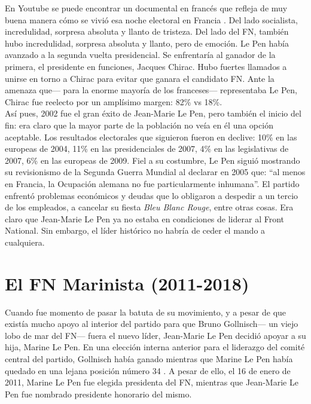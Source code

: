 En Youtube se puede encontrar un documental en francés que refleja de muy buena manera cómo se vivió esa noche electoral en Francia \parencite{Capo17}. Del lado socialista, incredulidad, sorpresa absoluta y llanto de tristeza. Del lado del FN, también hubo incredulidad, sorpresa absoluta y llanto, pero de emoción. Le Pen había avanzado a la segunda vuelta presidencial. Se enfrentaría al ganador de la primera, el presidente en funciones, Jacques Chirac. Hubo fuertes llamados a unirse en torno a Chirac para evitar que ganara el candidato FN. Ante la amenaza que--- para la enorme mayoría de los franceses--- representaba Le Pen, Chirac fue reelecto por un amplísimo margen: 82\% vs 18\%.\\

Así pues, 2002 fue el gran éxito de Jean-Marie Le Pen, pero también el inicio del fin: era claro que la mayor parte de la población no veía en él una opción aceptable. Los resultados electorales que siguieron fueron en declive: 10\% en las europeas de 2004, 11\% en las presidenciales de 2007, 4\% en las legislativas de 2007, 6\% en las europeas de 2009. Fiel a su costumbre, Le Pen siguió mostrando su revisionismo de la Segunda Guerra Mundial al declarar en 2005 que: ``al menos en Francia, la Ocupación alemana no fue particularmente inhumana''. El partido enfrentó problemas económicos y deudas que lo obligaron a despedir a un tercio de los empleados, a cancelar su fiesta \textit{Bleu Blanc Rouge}, entre otras cosas. Era claro que Jean-Marie Le Pen ya no estaba en condiciones de liderar al Front National. Sin embargo, el líder histórico no habría de ceder el mando a cualquiera.

\section{El FN Marinista (2011-2018)} 
 
Cuando fue momento de pasar la batuta de su movimiento, y a pesar de que existía mucho apoyo al interior del partido para que Bruno Gollnisch--- un viejo lobo de mar del FN--- fuera el nuevo líder, Jean-Marie Le Pen decidió apoyar a su hija, Marine Le Pen. En una elección interna anterior para el liderazgo del comité central del partido, Gollnisch había ganado mientras que Marine Le Pen había quedado en una lejana posición número 34 \parencite{Williams12}. A pesar de ello, el 16 de enero de 2011, Marine Le Pen fue elegida presidenta del FN, mientras que Jean-Marie Le Pen fue nombrado presidente honorario del mismo.\\ 

